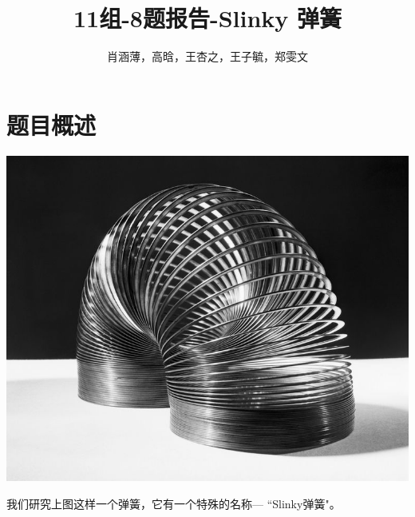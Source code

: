 \documentclass[UTF8,9pt]{report}
\title{11组-8题报告-Slinky 弹簧}
\author{肖涵薄，高晗，王杏之，王子毓，郑雯文}
\begin{document}
\maketitle
\tableofcontents

\chapter{题目概述} 
\begin{center}
    \includegraphics[scale=0.2]{1536562195277425.jpg}
\end{center}
我们研究上图这样一个弹簧，它有一个特殊的名称--- ``Slinky弹簧"。
\end{document}
